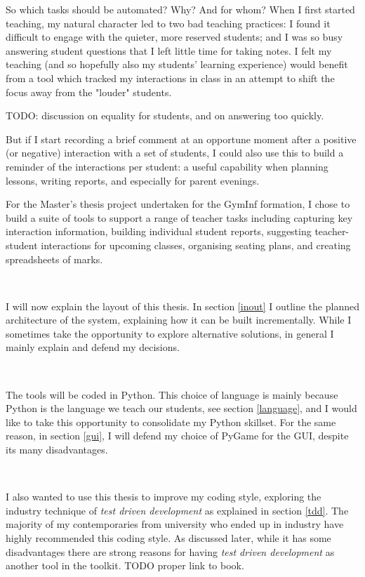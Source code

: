 \documentclass[10pt]{article}
\begin{document}
So which tasks should be automated? Why? And for whom? When I first started teaching, my natural character led to two bad teaching practices: I found it difficult to engage with the quieter, more reserved students; and I was so busy answering student questions that I left little time for taking notes. I felt my teaching (and so hopefully also my students' learning experience) would benefit from a tool which tracked my interactions in class in an attempt to shift the focus away from the "louder" students. 

TODO: discussion on equality for students, and \cite{Hat12} on answering too quickly.

But if I start recording a brief comment at an opportune moment after a positive (or negative) interaction with a set of students, I could also use this to build a reminder of the interactions per student: a useful capability when planning lessons, writing reports, and especially for parent evenings.

For the Master's thesis project undertaken for the GymInf formation, I chose to build a suite of tools to support a range of teacher tasks including capturing key interaction information, building individual student reports, suggesting teacher-student interactions for upcoming classes, organising seating plans, and creating spreadsheets of marks. 

\

I will now explain the layout of this thesis. In section \ref{inout} I outline the planned architecture of the system, explaining how it can be built incrementally. While I sometimes take the opportunity to explore alternative solutions, in general I mainly explain and defend my decisions.

\

The tools will be coded in Python. This choice of language is mainly because Python is the language we teach our students, see section \ref{language}, and I would like to take this opportunity to consolidate my Python skillset. For the same reason, in section \ref{gui}, I will defend my choice of PyGame for the GUI, despite its many disadvantages.

\

I also wanted to use this thesis to improve my coding style, exploring the industry technique of \emph{test driven development} as explained in section \ref{tdd}. The majority of my contemporaries from university who ended up in industry have highly recommended this coding style. As discussed later, while it has some disadvantages there are strong reasons for having \emph{test driven development} as another tool in the toolkit\cite{Amman16}. TODO proper link to book.
\end{document}
